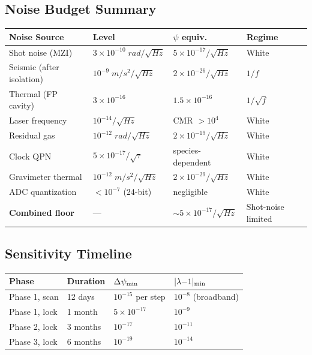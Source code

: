 \documentclass[11pt,a4paper]{article}
\begin{document}
\subsection{Noise Budget Summary}

\begin{longtable}{p{}p{}p{}p{}}
\toprule
\textbf{Noise Source} & \textbf{Level} & \textbf{$\psi$ equiv.} & \textbf{Regime} \\
\midrule
\endhead
Shot noise (MZI) & $3 \times 10^{-10}\;\si{rad/\sqrt{Hz}}$
& $5 \times 10^{-17}/\sqrt{\si{Hz}}$ & White \\
Seismic (after isolation) & $10^{-9}\;\si{m/s^2/\sqrt{Hz}}$
& $2 \times 10^{-26}/\sqrt{\si{Hz}}$ & $1/f$ \\
Thermal (FP cavity) & $3 \times 10^{-16}$
& $1.5 \times 10^{-16}$ & $1/\sqrt{f}$ \\
Laser frequency & $10^{-14}/\sqrt{\si{Hz}}$
& CMR $> 10^4$ & White \\
Residual gas & $10^{-12}\;\si{rad/\sqrt{Hz}}$
& $2 \times 10^{-19}/\sqrt{\si{Hz}}$ & White \\
Clock QPN & $5 \times 10^{-17}/\sqrt{\tau}$
& species-dependent & White \\
Gravimeter thermal & $10^{-12}\;\si{m/s^2/\sqrt{Hz}}$
& $2 \times 10^{-29}/\sqrt{\si{Hz}}$ & White \\
ADC quantization & $< 10^{-7}$ (24-bit)
& negligible & White \\
\midrule
\textbf{Combined floor} & --- & $\sim 5 \times 10^{-17}/\sqrt{\si{Hz}}$
& Shot-noise limited \\
\bottomrule
\end{longtable}

\subsection{Sensitivity Timeline}

\begin{longtable}{p{}p{}p{}p{}}
\toprule
\textbf{Phase} & \textbf{Duration} & \textbf{$\Delta\psi_{\rm min}$}
& \textbf{$|\lambda{-}1|_{\rm min}$} \\
\midrule
\endhead
Phase 1, scan & 12 days & $10^{-15}$ per step & $10^{-8}$ (broadband) \\
Phase 1, lock & 1 month & $5 \times 10^{-17}$ & $10^{-9}$ \\
Phase 2, lock & 3 months & $10^{-17}$ & $10^{-11}$ \\
Phase 3, lock & 6 months & $10^{-19}$ & $10^{-14}$ \\
\bottomrule
\end{longtable}
\end{document}

